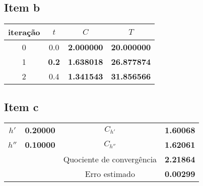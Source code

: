 {\subsection{Item b}
\begin{center} \begin{tabular}{c | c c c}
	iteração & $t$ & $C$ & $T$ \\ \hline
	0 & 0.0 & \textbf{2.000000} & \textbf{20.000000} \\
	1 & \textbf{0.2} & \textbf{1.638018} & \textbf{26.877874} \\
	2 & 0.4 & \textbf{1.341543} & \textbf{31.856566}
\end{tabular} \end{center}
\subsection{Item c}
\begin{center} \begin{tabular}{c | c || c | c}
	$h' $ & \textbf{0.20000} & $C_{h' }$ & \textbf{1.60068} \\
	$h''$ & \textbf{0.10000} & $C_{h''}$ & \textbf{1.62061} \\
	      &         & Quociente de convergência & \textbf{2.21864} \\
	      &         & Erro estimado & \textbf{0.00299}
\end{tabular} \end{center}
}